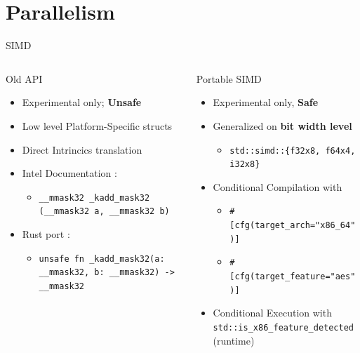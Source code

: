 \documentclass[compress,aspectratio=169]{beamer}
\begin{document}
\section{Parallelism}
\begin{frame}{SIMD}
  \begin{columns}
    \begin{column}{0.5\textwidth}
      \begin{block}{Old API}
        \begin{itemize}
          \item Experimental only; \textbf{Unsafe}
          \item Low level Platform-Specific structs
          \item Direct Intrincics translation
          \item Intel Documentation \cite{intel}:
            \begin{itemize}
              \item \texttt{\_\_mmask32 \_kadd\_mask32 (\_\_mmask32 a, \_\_mmask32 b)}
            \end{itemize}
          \item Rust port \cite{rustarch}:
            \begin{itemize}
              \item \texttt{unsafe fn \_kadd\_mask32(a: \_\_mmask32, b: \_\_mmask32) -> \_\_mmask32}
            \end{itemize}
        \end{itemize}
      \end{block}
    \end{column}
    \pause
    \begin{column}{0.5\textwidth}
      \begin{block}{Portable SIMD}
        \begin{itemize}
          \item Experimental only, \textbf{Safe}
          \item Generalized on \textbf{bit width level}
            \begin{itemize}
              \item \texttt{std::simd::\{f32x8, f64x4, i32x8\}}
            \end{itemize}
          \item Conditional Compilation \cite{concomp} with
            \begin{itemize}
              \item \texttt{\#[cfg(target\_arch="x86\_64")]}
              \item \texttt{\#[cfg(target\_feature="aes")]}
            \end{itemize}
          \item Conditional Execution \cite{isx86} with \texttt{std::is\_x86\_feature\_detected} (runtime)
        \end{itemize}
      \end{block}
    \end{column}
  \end{columns}
\end{frame}
\end{document}
